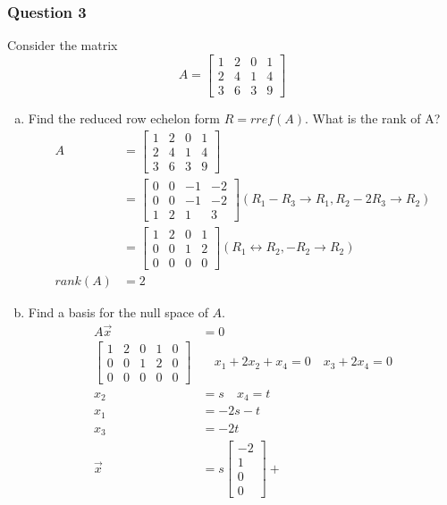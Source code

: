\documentclass{math}
\begin{document}
\subsubsection*{Question 3}
Consider the matrix
\[ A = \begin{bmatrix}
  1 & 2 & 0 & 1 \\
  2 & 4 & 1 & 4 \\
  3 & 6 & 3 & 9
\end{bmatrix} \]
\begin{enumerate}[(a)]
  \item Find the reduced row echelon form \( R = rref(A) \). What is the rank
    of A?
  \begin{align*}
    A &= \begin{bmatrix}
      1 & 2 & 0 & 1 \\
      2 & 4 & 1 & 4 \\
      3 & 6 & 3 & 9
    \end{bmatrix} \\
    &= \begin{bmatrix}
      0 & 0 & -1 & -2 \\
      0 & 0 & -1 & -2 \\
      1 & 2 & 1 & 3
    \end{bmatrix} (R_1-R_3 \to R_1, R_2-2R_3 \to R_2) \\
    &= \begin{bmatrix}
      1 & 2 & 0 & 1 \\
      0 & 0 & 1 & 2 \\
      0 & 0 & 0 & 0
    \end{bmatrix} (R_1 \leftrightarrow R_2, -R_2 \to R_2) \\
    rank(A) &= 2
  \end{align*}
  \item Find a basis for the null space of \( A \).
  \begin{align*}
    A\vec{x} &= 0 \\
    \begin{bmatrix}
      1 & 2 & 0 & 1 & 0 \\
      0 & 0 & 1 & 2 & 0 \\
      0 & 0 & 0 & 0 & 0
    \end{bmatrix} &\quad x_1+2x_2+x_4 = 0 \quad x_3+2x_4 = 0 \\
    x_2 &= s \quad x_4 = t \\
    x_1 &= -2s-t \\
    x_3 &= -2t \\
    \vec{x} &= s\begin{bmatrix}-2 \\ 1 \\ 0 \\ 0\end{bmatrix}+

\end{align*}
\end{enumerate}
\end{document}
